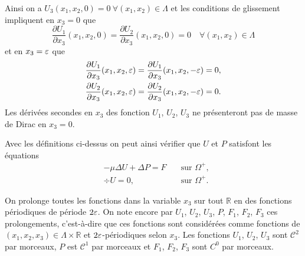 Ainsi on a $U_3(x_1, x_2, 0) = 0\ \forall(x_1, x_2)\in\Lambda$ et les
conditions de glissement impliquent en $x_3 = 0$ que
\begin{equation}
  \frac{\partial
U_1}{\partial x_3}(x_1,x_2, 0) = \frac{\partial U_2}{\partial
  x_3}(x_1, x_2, 0) = 0\quad \forall (x_1, x_2) \in \Lambda
\end{equation}
et en $x_3 = \varepsilon$ que
\begin{align}
  &\frac{\partial U_1}{\partial x_3}(x_1, x_2, \varepsilon) = \frac{\partial U_1}{\partial x_3}(x_1, x_2, -\varepsilon) = 0,\\
  &\frac{\partial U_2}{\partial x_3}(x_1, x_2, \varepsilon) = \frac{\partial U_2}{\partial x_3}(x_1, x_2, -\varepsilon) = 0.
\end{align}
Les dérivées secondes en $x_3$ des fonction $U_1$, $U_2$, $U_3$ ne
présenteront pas de masse de Dirac en $x_3 = 0$.

Avec les définitions ci-dessus on peut ainsi vérifier que $U$ et $P$
satisfont les équations
\begin{align}
  &-\mu\Delta U + \Delta P = F& \quad \text{sur }\Omega^+,\\
  &\div U = 0,& \quad \text{sur }\Omega^+.
\end{align}

On prolonge toutes les fonctions dans la variable $x_3$ sur tout
$\mathbb R$ en des fonctions périodiques de période $2\varepsilon$. On
note encore par $U_1$, $U_2$, $U_3$, $P$, $F_1$, $F_2$, $F_3$ ces
prolongements, c'est-à-dire que ces fonctions sont considérées comme
fonctions de $(x_1, x_2, x_3)\in \Lambda\times \mathbb R$ et
$2\varepsilon$-périodiques selon $x_3$. Les fonctions $U_1$, $U_2$,
$U_3$ sont $\mathcal C^2$ par morceaux, $P$ est $\mathcal C^1$ par
morceaux et $F_1$, $F_2$, $F_3$ sont $C^0$ par morceaux.

